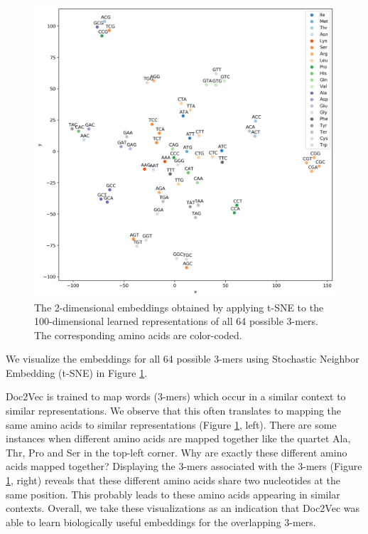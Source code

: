 \begin{figure}
	\includegraphics[width=1\textwidth]{../visualizations/ch4-methods/tsne_d2v_embeddings.png} 	
	\caption{
		The 2-dimensional embeddings obtained by applying t-SNE to the 100-dimensional learned representations of all 64 possible 3-mers. The corresponding amino acids are color-coded. 
	} %
	\label{fig:tsne}
\end{figure}

We visualize the embeddings for all 64 possible 3-mers using Stochastic Neighbor Embedding (t-SNE) \cite{tsne} in Figure \ref{fig:tsne}.

Doc2Vec is trained to map words (3-mers) which occur in a similar context to similar representations. We observe that this often translates to mapping the same amino acids to similar representations (Figure \ref{fig:tsne}, left). There are some instances when different amino acids are mapped together like the quartet Ala, Thr, Pro and Ser in the top-left corner. Why are exactly these different amino acids mapped together? Displaying the 3-mers associated with the 3-mers (Figure \ref{fig:tsne}, right) reveals that these different amino acids share two nucleotides at the same position. This probably leads to these amino acids appearing in similar contexts.
Overall, we take these visualizations as an indication that Doc2Vec was able to learn biologically useful embeddings for the overlapping 3-mers.
